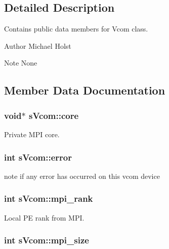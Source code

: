 \subsection{Detailed Description}
Contains public data members for Vcom class. \begin{DoxyAuthor}{Author}
Michael Holst 
\end{DoxyAuthor}
\begin{DoxyNote}{Note}
None 
\end{DoxyNote}


\subsection{Member Data Documentation}
\subsubsection[{core}]{\setlength{\rightskip}{0pt plus 5cm}void$\ast$ {\bf sVcom::core}}\label{a00001_ad4591b88c95fd3620d40f5568331c1f7}


Private MPI core. 

\subsubsection[{error}]{\setlength{\rightskip}{0pt plus 5cm}int {\bf sVcom::error}}\label{a00001_a0ccb38a7bc2fdb78dfb05987b5e86f18}


note if any error has occurred on this vcom device 

\subsubsection[{mpi\_\-rank}]{\setlength{\rightskip}{0pt plus 5cm}int {\bf sVcom::mpi\_\-rank}}\label{a00001_ae5090990cb02c43ed4ed25ecc1901ee2}


Local PE rank from MPI. 

\subsubsection[{mpi\_\-size}]{\setlength{\rightskip}{0pt plus 5cm}int {\bf sVcom::mpi\_\-size}}\label{a00001_a3370f33a730258e5174ba59b4b595cda}


